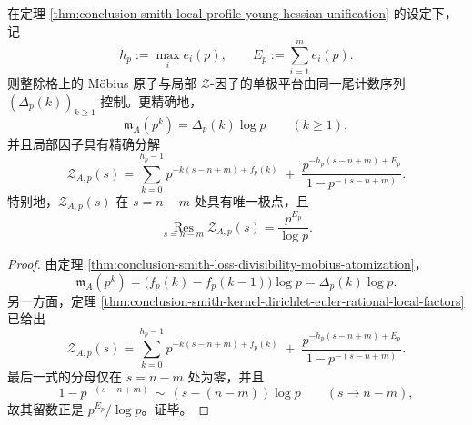 \begin{theorem}\label{thm:conclusion-smith-mobius-zeta-singlepole-platform}
在定理 \ref{thm:conclusion-smith-local-profile-young-hessian-unification} 的设定下，记
\[
h_p:=\max_i e_i(p),
\qquad
E_p:=\sum_{i=1}^{m}e_i(p).
\]
则整除格上的 Möbius 原子与局部 \(\mathcal Z\)-因子的单极平台由同一尾计数序列 \((\Delta_p(k))_{k\ge 1}\) 控制。更精确地，
\[
\mathfrak m_A(p^k)=\Delta_p(k)\log p
\qquad (k\ge 1),
\]
并且局部因子具有精确分解
\[
\mathcal Z_{A,p}(s)
=
\sum_{k=0}^{h_p-1}p^{-k(s-n+m)+f_p(k)}
\;+\;
\frac{p^{-h_p(s-n+m)+E_p}}{1-p^{-(s-n+m)}}.
\]
特别地，\(\mathcal Z_{A,p}(s)\) 在 \(s=n-m\) 处具有唯一极点，且
\[
\operatorname*{Res}_{s=n-m}\mathcal Z_{A,p}(s)=\frac{p^{E_p}}{\log p}.
\]
\end{theorem}
\begin{proof}
由定理 \ref{thm:conclusion-smith-loss-divisibility-mobius-atomization}，
\[
\mathfrak m_A(p^k)
=
\bigl(f_p(k)-f_p(k-1)\bigr)\log p
=
\Delta_p(k)\log p.
\]
另一方面，定理 \ref{thm:conclusion-smith-kernel-dirichlet-euler-rational-local-factors} 已给出
\[
\mathcal Z_{A,p}(s)
=
\sum_{k=0}^{h_p-1}p^{-k(s-n+m)+f_p(k)}
\;+\;
\frac{p^{-h_p(s-n+m)+E_p}}{1-p^{-(s-n+m)}}.
\]
最后一式的分母仅在 \(s=n-m\) 处为零，并且
\[
1-p^{-(s-n+m)}
\,\sim\,
(s-(n-m))\log p
\qquad (s\to n-m),
\]
故其留数正是 \(p^{E_p}/\log p\)。证毕。
\end{proof}

